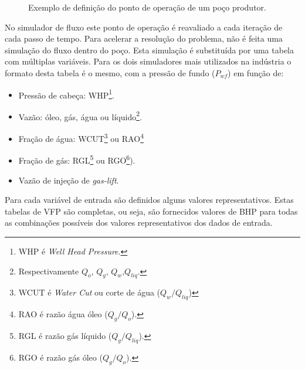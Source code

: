 \documentclass[final,5p]{elsarticle}
\numberwithin{equation}{section}
\begin{document}
\begin{figure}[hbt!]
            \caption{Exemplo de definição do ponto de operação de um poço produtor.}
            \label{fig:ipr}
        \end{figure}

        No simulador de fluxo este ponto de operação é reavaliado a cada iteração de cada passo de tempo. Para acelerar a resolução do problema, não é feita uma simulação do fluxo dentro do poço. Esta simulação é substituída por uma tabela com múltiplas variáveis. Para os dois simuladores mais utilizados na indústria o formato desta tabela é o mesmo, com a pressão de fundo ($P_{wf}$) em função de:

        \begin{itemize}
            \item Pressão de cabeça: WHP\footnote{WHP é \emph{Well Head Pressure}.}.
            \item Vazão: óleo, gás, água ou líquido\footnote{Respectivamente $Q_o$, $Q_g$, $Q_w$,$Q_{liq}$.}.
            \item Fração de água: WCUT\footnote{WCUT é \emph{Water Cut} ou corte de água ($Q_w/Q_{liq}$)} ou RAO\footnote{RAO é razão água óleo ($Q_g/Q_o$).}
            \item Fração de gás: RGL\footnote{RGL é razão gás líquido ($Q_g/Q_{liq}$).} ou RGO\footnote{RGO é razão gás óleo ($Q_g/Q_o$).}).
            \item Vazão de injeção de \emph{gas-lift}.
        \end{itemize}

        Para cada variável de entrada são definidos alguns valores representativos. Estas tabelas de VFP são completas, ou seja, são fornecidos valores de BHP para todas as combinações possíveis dos valores representativos dos dados de entrada.    
\end{document}
